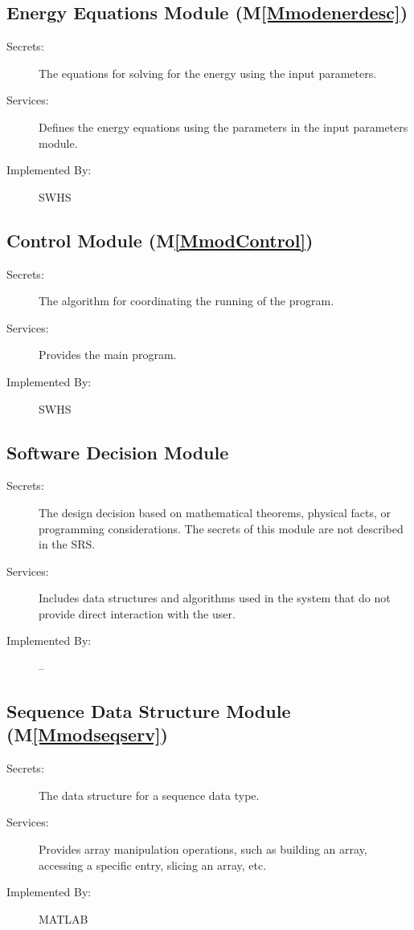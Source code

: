 \documentclass[12pt]{article}
\begin{document}
\subsection{Energy Equations Module (M\ref{Mmodenerdesc})}
\label{Sec:EnerEquaModu()}
\begin{description}
\item[Secrets:]The equations for solving for the energy using the input parameters.
\item[Services:]Defines the energy equations using the parameters in the input parameters module.
\item[Implemented By:]SWHS
\end{description}
\subsection{Control Module (M\ref{MmodControl})}
\label{Sec:ContModu()}
\begin{description}
\item[Secrets:]The algorithm for coordinating the running of the program.
\item[Services:]Provides the main program.
\item[Implemented By:]SWHS
\end{description}
\subsection{Software Decision Module}
\label{Sec:SoftDeciModu}
\begin{description}
\item[Secrets:]The design decision based on mathematical theorems, physical facts, or programming considerations. The secrets of this module are not described in the SRS.
\item[Services:]Includes data structures and algorithms used in the system that do not provide direct interaction with the user.
\item[Implemented By:]--
\end{description}
\subsection{Sequence Data Structure Module (M\ref{Mmodseqserv})}
\label{Sec:SequDataStruModu()}
\begin{description}
\item[Secrets:]The data structure for a sequence data type.
\item[Services:]Provides array manipulation operations, such as building an array, accessing a specific entry, slicing an array, etc.
\item[Implemented By:]MATLAB
\end{description}
\end{document}

